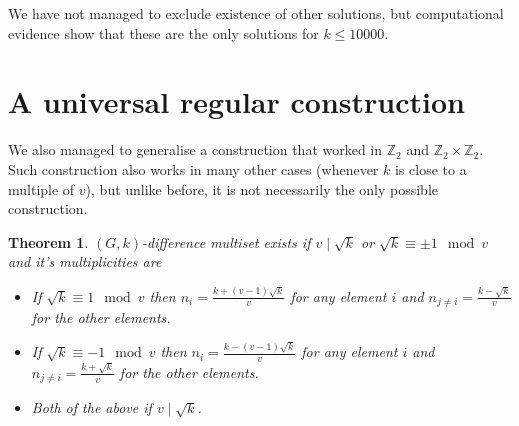 \documentclass{article}
\theoremstyle{plain}
\newtheorem{theorem}{Theorem}[section]
\theoremstyle{definition}
\theoremstyle{remark}
\begin{document}
			We have not managed to exclude existence of other solutions, but computational evidence show that these are the only solutions for $k \leq 10000$.
	
	\section{A universal regular construction}
		We also managed to generalise a construction that worked in $\mathbb Z_2$ and $\mathbb Z_2 \times \mathbb Z_2$. Such construction also works in many other cases (whenever $k$ is close to a multiple of $v$), but unlike before, it is not necessarily the only possible construction.
		
		\begin{theorem}
			\label{regular:theorem:regular}
			$(G,k)$-difference multiset exists if $v \mid \sqrt k$ or $\sqrt k \equiv \pm 1 \mod v$ and it's multiplicities are 
				\begin{itemize}
					\item If $\sqrt k \equiv 1 \mod v$ then $n_i = \frac{k + (v-1)\sqrt k}{v}$ for any element $i$ and $n_{j \neq i} = \frac{k - \sqrt k}{v}$ for the other elements.
					\item If $\sqrt k \equiv -1 \mod v$ then $n_i = \frac{k - (v-1)\sqrt k}{v}$ for any element $i$ and $n_{j \neq i} = \frac{k + \sqrt k}{v}$ for the other elements.
					\item Both of the above if $v \mid \sqrt k$.
				\end{itemize}
		\end{theorem}
		
\end{document}
